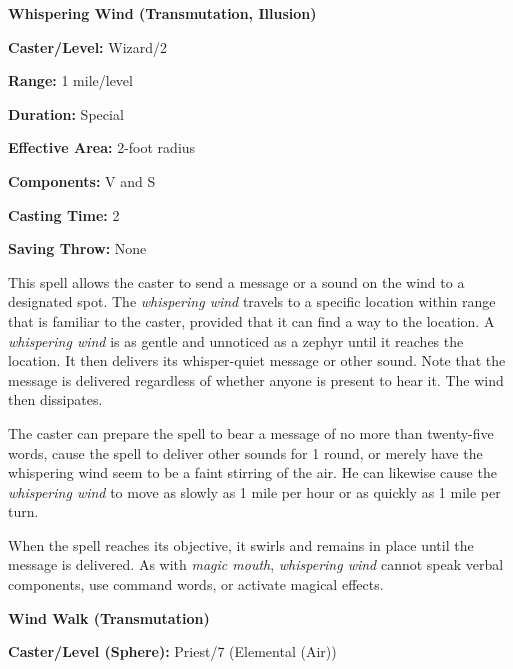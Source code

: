 \begin{multicols}{2}
\vspace{1em}

\noindent
\begin{minipage}{\columnwidth}

\noindent \textbf{Whispering Wind (Transmutation, Illusion)}

\noindent \textbf{Caster/Level:} Wizard/2

\noindent \textbf{Range:} 1 mile/level

\noindent \textbf{Duration:} Special

\noindent \textbf{Effective Area:} 2-foot radius

\noindent \textbf{Components:} V and S

\noindent \textbf{Casting Time:} 2

\noindent \textbf{Saving Throw:} None

\end{minipage}

This spell allows the caster to send a message or a sound on the wind to a designated spot.  The \textit{whispering wind} travels to a specific location within range that is familiar to the caster, provided that it can find a way to the location.  A \textit{whispering wind} is as gentle and unnoticed as a zephyr until it reaches the location.  It then delivers its whisper-quiet message or other sound.  Note that the message is delivered regardless of whether anyone is present to hear it.  The wind then dissipates. 

The caster can prepare the spell to bear a message of no more than twenty-five words, cause the spell to deliver other sounds for 1 round, or merely have the whispering wind seem to be a faint stirring of the air.  He can likewise cause the \textit{whispering wind} to move as slowly as 1 mile per hour or as quickly as 1 mile per turn. 

When the spell reaches its objective, it swirls and remains in place until the message is delivered.  As with \textit{magic mouth}, \textit{whispering wind} cannot speak verbal components, use command words, or activate magical effects.

\vspace{1em}

\noindent
\begin{minipage}{\columnwidth}

\noindent \textbf{Wind Walk (Transmutation)}

\noindent \textbf{Caster/Level (Sphere):} Priest/7 (Elemental (Air))


\end{minipage}
\end{multicols}
